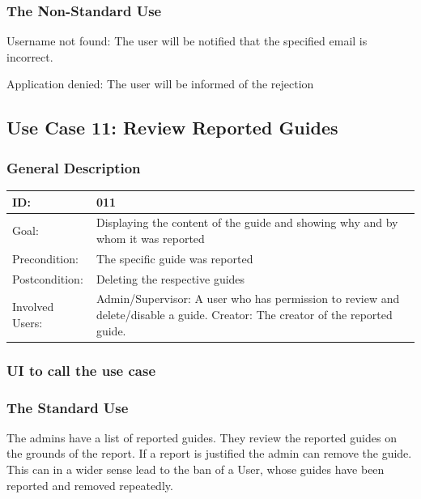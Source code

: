 \documentclass[12pt]{article}
\theoremstyle{definition}
\newenvironment{text}{
   \setlength{\parindent}{0pt}
   \color{black}
}{}
\begin{document}
    \subsubsection{The Non-Standard Use}
    \begin{text}
    
    Username not found: The user will be notified that the specified email is incorrect.
    
    Application denied: The user will be informed of the rejection
    \end{text}

\subsection{Use Case 11: Review Reported Guides}
    \subsubsection{General Description}
    
    \begin{tabular}{|p{.2\linewidth}|p{.65\linewidth}|}
    \hline 
    ID: & 011 \\ \hline
    Goal: & Displaying the content of the guide and showing why and by whom it was reported\\ \hline
    Precondition: &  The specific guide was reported\\ \hline
    Postcondition: & Deleting the respective guides\\ \hline
    Involved Users: & Admin/Supervisor: A user who has permission to review and delete/disable a guide. \newline
    Creator: The creator of the reported guide. \\ \hline
    \end{tabular}
    
    \subsubsection{UI to call the use case}
    \begin{text}
    \end{text}
    
    \subsubsection{The Standard Use}
    \begin{text}
    The admins have a list of reported guides. They review the reported guides on the grounds of the report. If a report is justified the admin can remove the guide. This can in a wider sense lead to the ban of a User, whose guides have been reported and removed repeatedly.
    \end{text}
    
\end{document}
